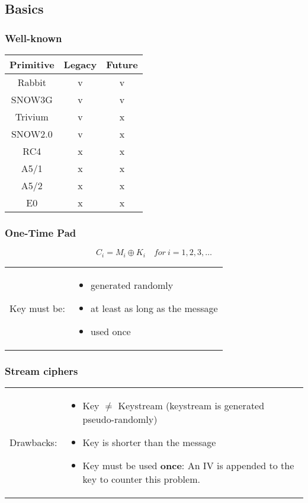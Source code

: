 
\subsection{Basics}
\subsubsection{Well-known}
\begin{center}
    \begin{tabular}{|c|c|c|}
        \hline
        Primitive & Legacy & Future\\
        \hline
        Rabbit & \textcolor{green!50!black}{v} & \textcolor{green!50!black}{v}\\
        SNOW3G & \textcolor{green!50!black}{v} & \textcolor{green!50!black}{v}\\
        \hline
        Trivium & \textcolor{green!50!black}{v} &
        \textcolor{red!50!black}{x}\\
        SNOW2.0 & \textcolor{green!50!black}{v} & \textcolor{red!50!black}{x}\\
        \hline
        RC4 & \textcolor{red!50!black}{x} & \textcolor{red!50!black}{x}\\
        A5/1 & \textcolor{red!50!black}{x} & \textcolor{red!50!black}{x}\\
        A5/2 & \textcolor{red!50!black}{x} & \textcolor{red!50!black}{x}\\
        E0 & \textcolor{red!50!black}{x} & \textcolor{red!50!black}{x}\\
        \hline
    \end{tabular}
\end{center}

\subsubsection{One-Time Pad} 
$$C_i = M_i \oplus K_i\quad for\ i=1,2,3,\ldots$$

\begin{tabular}{m{3cm}m{8cm}}
    Key must be:&
\begin{itemize}
    \item generated randomly
    \item at least as long as the message
    \item used once
\end{itemize}
\end{tabular}


\subsubsection{Stream ciphers}
\begin{tabular}{m{2cm}m{14cm}}
    Drawbacks: &
    \begin{itemize}
        \item Key $\neq$ Keystream (keystream is generated
            pseudo-randomly)
        \item Key is shorter than the message
        \item Key must be used \textbf{once}: An IV is appended to the key to
            counter this problem.
    \end{itemize}
\end{tabular}

